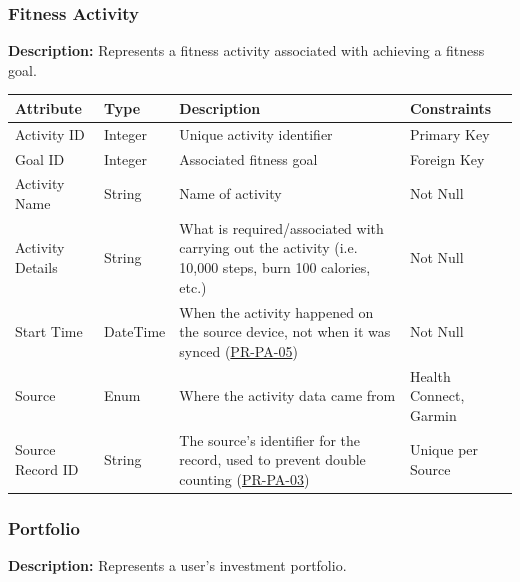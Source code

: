 \documentclass[12pt]{article}
\begin{document}
\subsubsection{Fitness Activity} 

\textbf{Description:} Represents a fitness activity associated with achieving a fitness goal. 

\begin{xltabular}{\textwidth}{|p{3cm}|p{2cm}|X|p{3cm}|} 
    \hline 
    \textbf{Attribute} & \textbf{Type} & \textbf{Description} & \textbf{Constraints} \\ 
    \hline 
    
    Activity ID & Integer & Unique activity identifier & Primary Key \\ 
    \hline 
    
    Goal ID & Integer & Associated fitness goal & Foreign Key \\ 
    \hline 
    
    Activity Name & String & Name of activity & Not Null \\ 
    \hline 
    
    Activity Details & String & What is required/associated with carrying out the activity (i.e. 10,000 steps, burn 100 calories, etc.) & Not Null \\ 
    \hline 
    
    Start Time & DateTime & When the activity happened on the source device, not when it was synced (\hyperlink{req:PR-PA-05}{PR-PA-05}) & Not Null \\ 
    \hline 
    
    Source & Enum & Where the activity data came from & Health Connect, Garmin \\ 
    \hline 
    
    Source Record ID & String & The source's identifier for the record, used to prevent double counting (\hyperlink{req:PR-PA-03}{PR-PA-03}) & Unique per Source \\ 
    \hline
\end{xltabular}

\subsubsection{Portfolio} 

\textbf{Description:} Represents a user's investment portfolio. 
\end{document}
